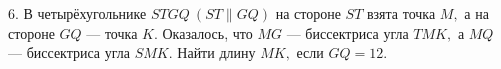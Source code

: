6. В четырёхугольнике $STGQ\ (ST\parallel GQ)$ на стороне $ST$ взята точка $M,$ а на стороне $GQ$ --- точка $K.$ Оказалось, что $MG$ --- биссектриса угла $TMK,$ а $MQ$ --- биссектриса угла $SMK.$ Найти длину $MK,$ если $GQ=12.$\\
